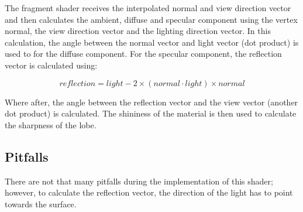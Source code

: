 \documentclass[a4paper,12pt]{article}
\begin{document}
The fragment shader receives the interpolated normal and view direction vector and then calculates the ambient, diffuse and specular component using the vertex normal, the view direction vector and the lighting direction vector. In this calculation, the angle between the normal vector and light vector (dot product) is used to for the diffuse component. For the specular component, the reflection vector is calculated using:

	\[ reflection = light-2 \times (normal \cdot light) \times normal \]

Where after, the angle between the reflection vector and the view vector (another dot product) is calculated. The shininess of the material is then used to calculate the sharpness of the lobe.

\subsection{Pitfalls}
\label{sec:PitfallsPhongShader}

There are not that many pitfalls during the implementation of this shader; however, to calculate the reflection vector, the direction of the light has to point towards the surface.

\end{document}
